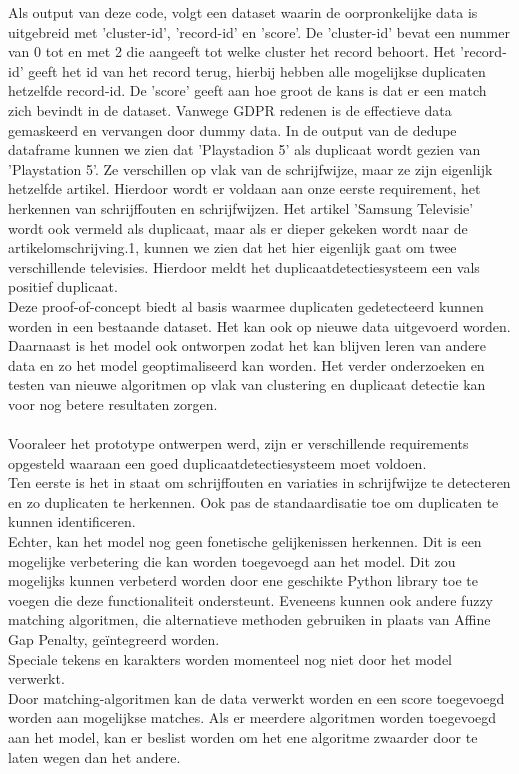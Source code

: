 Als output van deze code, volgt een dataset waarin de oorpronkelijke data is uitgebreid met 'cluster-id', 'record-id' en 'score'. De 'cluster-id' bevat een nummer van 0 tot en met 2 die aangeeft tot welke cluster het record behoort. Het 'record-id' geeft het id van het record terug, hierbij hebben alle mogelijkse duplicaten hetzelfde record-id. De 'score' geeft aan hoe groot de kans is dat er een match zich bevindt in de dataset.
Vanwege GDPR redenen is de effectieve data gemaskeerd  en vervangen door dummy data. In de output van de dedupe dataframe kunnen we zien dat 'Playstadion 5' als duplicaat wordt gezien van 'Playstation 5'. Ze verschillen op vlak van de schrijfwijze, maar ze zijn eigenlijk hetzelfde artikel. Hierdoor wordt er voldaan aan onze eerste requirement, het herkennen van schrijffouten en schrijfwijzen. Het artikel 'Samsung Televisie' wordt ook vermeld als duplicaat, maar als er dieper gekeken wordt naar de artikelomschrijving.1, kunnen we zien dat het hier eigenlijk gaat om twee verschillende televisies. Hierdoor meldt het duplicaatdetectiesysteem een vals positief duplicaat.
\\Deze proof-of-concept biedt al basis waarmee duplicaten gedetecteerd kunnen worden in een bestaande dataset. Het kan ook op nieuwe data uitgevoerd worden. Daarnaast is het model ook ontworpen zodat het kan blijven leren van andere data en zo het model geoptimaliseerd kan worden. Het verder onderzoeken en testen van nieuwe algoritmen op vlak van clustering en duplicaat detectie kan voor nog betere resultaten zorgen. 
\\ \\Vooraleer het prototype ontwerpen werd, zijn er verschillende requirements opgesteld waaraan een goed duplicaatdetectiesysteem moet voldoen.
\\Ten eerste is het in staat om schrijffouten en variaties in schrijfwijze te detecteren en zo duplicaten te herkennen. Ook pas de standaardisatie toe om duplicaten te kunnen identificeren.
\\Echter, kan het model nog geen fonetische gelijkenissen herkennen. Dit is een mogelijke verbetering die kan worden toegevoegd aan het model. Dit zou mogelijks kunnen verbeterd worden door ene geschikte Python library toe te voegen die deze functionaliteit ondersteunt. Eveneens kunnen ook andere fuzzy matching algoritmen, die alternatieve methoden gebruiken in plaats van Affine Gap Penalty, geïntegreerd worden.
\\Speciale tekens en karakters worden momenteel nog niet door het model verwerkt.
\\Door matching-algoritmen kan de data verwerkt worden en een score toegevoegd worden aan mogelijkse matches. Als er meerdere algoritmen worden toegevoegd aan het model, kan er beslist worden om het ene algoritme zwaarder door te laten wegen dan het andere. 